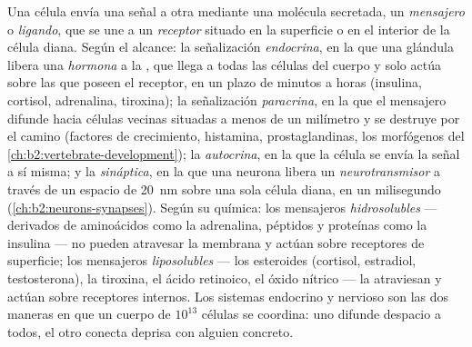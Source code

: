 \begin{definition}\label{def:b2:cell-signalling:kinds}
Una célula envía una señal a otra mediante una molécula secretada, un
\emph{mensajero} o \emph{ligando}, que se une a un \emph{receptor} situado
en la superficie o en el interior de la célula diana. Según el alcance: la
señalización \emph{endocrina}, en la que una glándula libera una
\emph{hormona} a la , que llega a todas las células del cuerpo y
solo actúa sobre las que poseen el receptor, en un plazo de minutos a
horas (insulina, cortisol, adrenalina, tiroxina); la señalización
\emph{paracrina}, en la que el mensajero difunde hacia células vecinas
situadas a menos de un milímetro y se destruye por el camino (factores
de crecimiento, histamina, prostaglandinas, los morfógenos del
\cref{ch:b2:vertebrate-development}); la \emph{autocrina}, en la que la
célula se envía la señal a sí misma; y la \emph{sináptica}, en la que una
neurona libera un \emph{neurotransmisor} a través de un espacio de
\qty{20}{nm} sobre una sola célula diana, en un milisegundo
(\cref{ch:b2:neurons-synapses}).
Según su química: los mensajeros \emph{hidrosolubles} --- derivados de
aminoácidos como la adrenalina, péptidos y proteínas como la
insulina --- no pueden atravesar la membrana y actúan sobre receptores de
superficie; los mensajeros \emph{liposolubles} --- los esteroides
(cortisol, estradiol, testosterona), la tiroxina, el ácido retinoico, el
óxido nítrico --- la atraviesan y actúan sobre receptores internos. Los
sistemas endocrino y nervioso son las dos maneras en que un cuerpo de
$10^{13}$ células se coordina: uno difunde despacio a todos, el otro
conecta deprisa con alguien concreto.
\end{definition}
